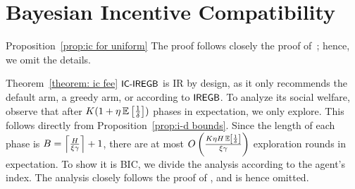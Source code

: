 \section{Bayesian Incentive Compatibility}\label{sec:IC in app}
\begin{proofof}{Proposition~\ref{prop:ic for uniform}}
The proof follows closely the proof of~\citet[Section E]{Fiduciary}; hence, we omit the details.
\end{proofof}

\begin{proofof}{Theorem~\ref{theorem: ic fee}}
$\ICSEGB$ is IR by design, as it only recommends the default arm, a greedy arm, or according to $\SEGB$. To analyze its social welfare, observe that after $K(1+{\eta}\E\left[\frac{1}{\delta}\right])$ phases in expectation, we only explore. This follows directly from Proposition~\ref{prop:i-d bounds}. Since the length of each phase is $B=\ceil*{\frac{H}{\xi \gamma}}+1$, there are at most $O\left(\frac{K \eta H \E\left[\frac{1}{\delta}\right]}{\xi \gamma}  \right)$ exploration rounds in expectation. To show it is BIC, we divide the analysis according to the agent's index. The analysis closely follows the proof of \citet[Theorem 3]{Fiduciary}, and is hence omitted.
\end{proofof}